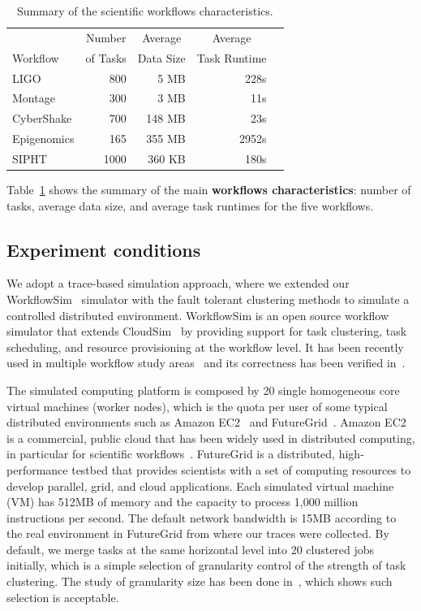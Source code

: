 \documentclass{IOS-Book-Article}
\begin{document}
\begin{table}[!htb]
	\setlength{\tabcolsep}{11pt}
	\centering
	\small
	\begin{tabular}{lrrrr}
		\hline
		 & \multicolumn{1}{c}{Number} & \multicolumn{1}{c}{Average} &  \multicolumn{1}{c}{Average} \\
		Workflow	& of Tasks	 & Data Size & Task Runtime \\
		\hline
		LIGO 		&800		& 5 MB	& 228s\\
		Montage 		&300		&3 MB	&11s\\
		CyberShake 	&700		&148 MB 	& 23s\\
		Epigenomics 	&165 	& 355 MB	& 2952s\\
		SIPHT		&1000	& 360 KB 	& 180s\\
		\hline
	\end{tabular}
	\caption{Summary of the scientific workflows characteristics.}
	\label{tab:evaluation_workflows}
\end{table} 

Table~\ref{tab:evaluation_workflows} shows the summary of the main \textbf{workflows characteristics}: number of tasks, average data size, and average task runtimes for the five workflows. 


\subsection{Experiment conditions}
\label{sec:experiment_conditions}
We adopt a trace-based simulation approach, where we extended our WorkflowSim~\cite{WorkflowSim} simulator with the fault tolerant clustering methods to simulate a controlled distributed environment. WorkflowSim is an open source workflow simulator that extends CloudSim~\cite{Calheiros2011} by providing support for task clustering, task scheduling, and resource provisioning at the workflow level. It has been recently used in multiple workflow study areas~\cite{WorkflowSim,Chen2012, jrad2013broker} and its correctness has been verified in~\cite{WorkflowSim}. 

The simulated computing platform is composed by 20 single homogeneous core virtual machines (worker nodes), which is the quota per user of some typical distributed environments such as Amazon EC2~\cite{AmazonAWS} and FutureGrid~\cite{FutureGrid}. Amazon EC2 is a commercial, public cloud that has been widely used in distributed computing, in particular for scientific workflows~\cite{Berriman2010}. FutureGrid is a distributed, high-performance testbed that provides scientists with a set of computing resources to develop parallel, grid, and cloud applications. Each simulated virtual machine (VM) has 512MB of memory and the capacity to process 1,000 million instructions per second. The default network bandwidth is 15MB according to the real environment in FutureGrid from where our traces were collected. By default, we merge tasks at the same horizontal level into 20 clustered jobs initially, which is a simple selection of granularity control of the strength of task clustering. The study of granularity size has been done in~\cite{Chen2013b}, which shows such selection is acceptable. 
\end{document}
